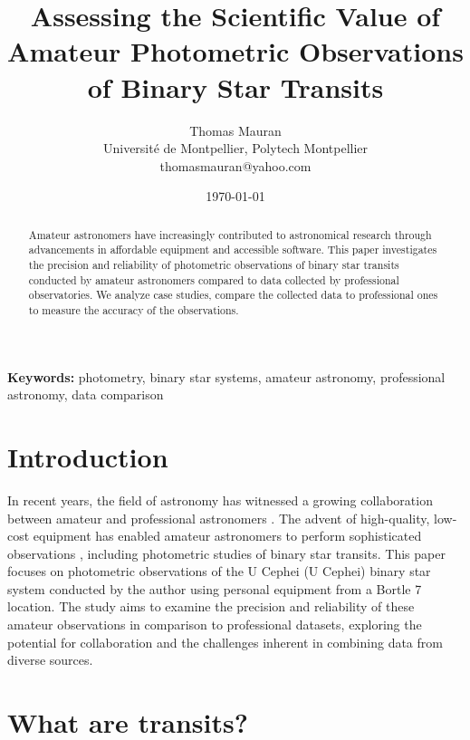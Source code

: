 \documentclass[12pt,a4paper]{article}
\title{Assessing the Scientific Value of Amateur Photometric Observations of Binary Star Transits}
\author{Thomas Mauran \\\small Université de Montpellier, Polytech Montpellier \\\small thomasmauran@yahoo.com}
\date{\today}
\begin{document}
\maketitle

\begin{abstract}
Amateur astronomers have increasingly contributed to astronomical research through advancements in affordable equipment and accessible software. This paper investigates the precision and reliability of photometric observations of binary star transits conducted by amateur astronomers compared to data collected by professional observatories. We analyze case studies, compare the collected data to professional ones to measure the accuracy of the observations.
\end{abstract}

\textbf{Keywords:} photometry, binary star systems, amateur astronomy, professional astronomy, data comparison

\newpage

\tableofcontents

\newpage

\section{Introduction}
In recent years, the field of astronomy has witnessed a growing collaboration between amateur 
and professional astronomers \cite{AmateurContribution}. The advent of high-quality, low-cost equipment has enabled 
amateur astronomers to perform sophisticated observations \cite{AmateurObservation}, including photometric studies of 
binary star transits. This paper focuses on photometric observations of the U Cephei 
(U Cephei) binary star system conducted by the author using personal equipment from a 
Bortle 7 location. The study aims to examine the precision and reliability of these amateur 
observations in comparison to professional datasets, exploring the potential for collaboration
and the challenges inherent in combining data from diverse sources.

\section{What are transits?}
\end{document}
